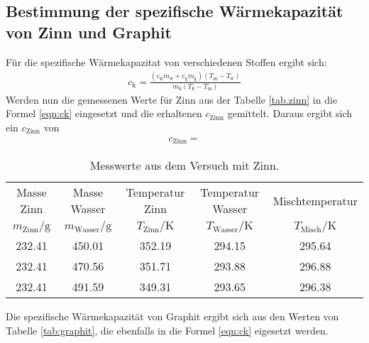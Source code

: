 \subsection{Bestimmung der spezifische Wärmekapazität von Zinn und Graphit}
Für die spezifische Wärmekapazitat von verschiedenen Stoffen ergibt sich:
\begin{align}
c_\mathrm{k}=\frac{(c_\mathrm{w} m_\mathrm{w}+c_\mathrm{g} m_\mathrm{g})(T_\mathrm{m}-T_\mathrm{w})}{m_\mathrm{k}(T_\mathrm{k}-T_\mathrm{m})}\label{eqn:ck}
\end{align}
Werden nun die gemessenen Werte für Zinn aus der Tabelle \ref{tab.zinn} in die Formel \eqref{eqn:ck} eingesetzt und die erhaltenen $c_{\mathrm{Zinn}}$ gemittelt.
Daraus ergibt sich ein $c_{\mathrm{Zinn}}$ von
\begin{align*}
c_\mathrm{Zinn} =
\end{align*}
\begin{table}
  \centering
  \caption{Messwerte aus dem Versuch mit Zinn.}
  \label{tab:zinn}
   \begin{tabular}{c c c c c}
\toprule
Masse Zinn & Masse Wasser & Temperatur Zinn & Temperatur Wasser  & Mischtemperatur \\
$m_\mathrm{Zinn}/\si{\gram}$ & $m_\mathrm{Wasser}/\si{\gram}$ & $T_\mathrm{Zinn}/\si{\kelvin}$ & $T_\mathrm{Wasser}/\si{\kelvin}$ & $T_\mathrm{Misch}/\si{\kelvin}$ \\
\midrule
     232.41 &   450.01 &  352.19 &   294.15  &   295.64 \\
     232.41 &   470.56 &  351.71 &   293.88  &   296.88 \\
     232.41 &   491.59 &  349.31 &   293.65  &   296.38 \\
\bottomrule
\end{tabular}
\end{table}

Die spezifische Wärmekapazität von Graphit ergibt sich aus den Werten von Tabelle \ref{tab:graphit},
die ebenfalls in die Formel \eqref{eqn:ck} eigesetzt werden.
